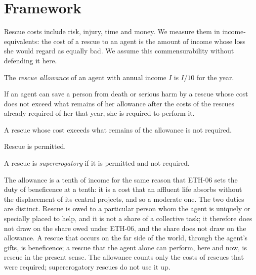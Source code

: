 \documentclass{situationist-preprint}
\begin{document}
\section{Framework}

Rescue costs include risk, injury, time and money. We measure them in income-equivalents: the cost of a rescue to an agent is the amount of income whose loss she would regard as equally bad. We assume this commensurability without defending it here.

\begin{definition}[Allowance]\label{d:allowance}
The \emph{rescue allowance} of an agent with annual income $I$ is $I/10$ for the year.
\end{definition}

\begin{assumption}\label{a:principle}
If an agent can save a person from death or serious harm by a rescue whose cost does not exceed what remains of her allowance after the costs of the rescues already required of her that year, she is required to perform it.
\end{assumption}

\begin{assumption}[Limit]\label{a:limit}
A rescue whose cost exceeds what remains of the allowance is not required.
\end{assumption}

\begin{assumption}\label{a:permitted}
Rescue is permitted.
\end{assumption}

\begin{definition}\label{d:super}
A rescue is \emph{supererogatory} if it is permitted and not required.
\end{definition}

The allowance is a tenth of income for the same reason that ETH-06 sets the duty of beneficence at a tenth: it is a cost that an affluent life absorbs without the displacement of its central projects, and so a moderate one. The two duties are distinct. Rescue is owed to a particular person whom the agent is uniquely or specially placed to help, and it is not a share of a collective task; it therefore does not draw on the share owed under ETH-06, and the share does not draw on the allowance. A rescue that occurs on the far side of the world, through the agent's gifts, is beneficence; a rescue that the agent alone can perform, here and now, is rescue in the present sense. The allowance counts only the costs of rescues that were required; supererogatory rescues do not use it up.
\end{document}
